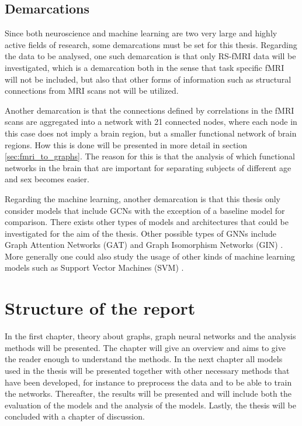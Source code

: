 
\subsection{Demarcations}
Since both neuroscience and machine learning are two very large and highly active fields of research, some demarcations must be set for this thesis. Regarding the data to be analysed, one such demarcation is that only RS-fMRI data will be investigated, which is a demarcation both in the sense that task specific fMRI will not be included, but also that other forms of information such as structural connections from MRI scans not will be utilized. 

Another demarcation is that the connections defined by correlations in the fMRI scans are aggregated into a network with 21 connected nodes, where each node in this case does not imply a brain region, but a smaller functional network of brain regions. How this is done will be presented in more detail in section \ref{sec:fmri_to_graphs}. The reason for this is that the analysis of which functional networks in the brain that are important for separating subjects of different age and sex becomes easier. 

Regarding the machine learning, another demarcation is that this thesis only consider models that include GCNs with the exception of a baseline model for comparison. There exists other types of models and architectures that could be investigated for the aim of the thesis. Other possible types of GNNs include Graph Attention Networks (GAT) \cite{gat} and Graph Isomorphism Networks (GIN) \cite{gin}. More generally one could also  study the usage of other kinds of machine learning models such as Support Vector Machines (SVM) \cite{neuro_ml}.


\section{Structure of the report}
In the first chapter, theory about graphs, graph neural networks and the analysis methods will be presented. The chapter will give an overview and aims to give the reader enough to understand the methods. In the next chapter all models used in the thesis will be presented together with other necessary methods that have been developed, for instance to preprocess the data and to be able to train the networks. Thereafter, the results will be presented and will include both the evaluation of the models and the analysis of the models. Lastly, the thesis will be concluded with a chapter of discussion. 

